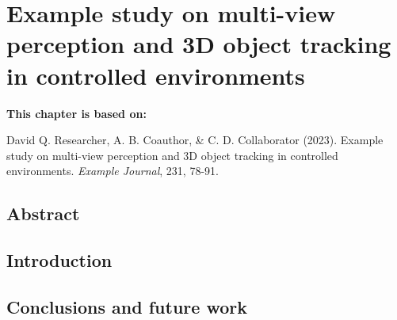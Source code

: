 \chapter[Example study on multi-view perception and 3D object tracking in controlled environments]{Example study on multi-view perception and 3D object tracking in controlled environments}
\label{cha:chapter2}
\vspace*{\fill}
\textbf{This chapter is based on:}

David Q. Researcher, A. B. Coauthor, \& C. D. Collaborator (2023). Example study on multi-view perception and 3D object tracking in controlled environments. \textit{Example Journal}, 231, 78-91.
\newpage
\newpage

\section*{Abstract}
\lipsum[1]

\newpage

\section{Introduction}

\lipsum[1-3]

\section{Conclusions and future work} 
\lipsum[4]